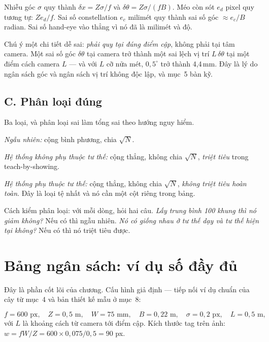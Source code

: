 \documentclass[../../marker.tex]{subfiles}
\begin{document}
Nhiễu góc \(\sigma\) quy thành \(\delta x = Z\sigma/f\) và \(\delta\theta = Z\sigma/(fB)\). Méo còn sót \(e_d\) pixel quy tương tự: \(Z e_d/f\). Sai số constellation \(e_c\) milimét quy thành sai số góc \(\approx e_c/B\) radian. Sai số hand-eye vào thẳng vì nó đã là milimét và độ.

Chú ý một chi tiết dễ sai: \emph{phải quy tại đúng điểm cập}, không phải tại tâm camera. Một sai số góc \(\delta\theta\) tại camera trở thành một sai lệch vị trí \(L\,\delta\theta\) tại một điểm cách camera \(L\) --- và với \(L\) cỡ nửa mét, \(0{,}5^\circ\) trở thành 4,4\,mm. Đây là lý do ngân sách góc và ngân sách vị trí không độc lập, và mục~5 bàn kỹ.

\subsection{C. Phân loại đúng}

Ba loại, và phân loại sai làm tổng sai theo hướng nguy hiểm.

\emph{Ngẫu nhiên:} cộng bình phương, chia \(\sqrt{N}\).

\emph{Hệ thống không phụ thuộc tư thế:} cộng thẳng, không chia \(\sqrt{N}\), \emph{triệt tiêu} trong teach-by-showing.

\emph{Hệ thống phụ thuộc tư thế:} cộng thẳng, không chia \(\sqrt{N}\), \emph{không triệt tiêu hoàn toàn}. Đây là loại tệ nhất và nó cần một cột riêng trong bảng.

Cách kiểm phân loại: với mỗi dòng, hỏi hai câu. \emph{Lấy trung bình 100 khung thì nó giảm không?} Nếu có thì ngẫu nhiên. \emph{Nó có giống nhau ở tư thế dạy và tư thế hiện tại không?} Nếu có thì nó triệt tiêu được.

\section{Bảng ngân sách: ví dụ số đầy đủ}

Đây là phần cốt lõi của chương. Cấu hình giả định --- tiếp nối ví dụ chuẩn của cây từ  mục~4 và bản thiết kế mẫu ở  mục~8:

\[
f = 600\text{ px}, \quad Z = 0{,}5\text{ m}, \quad W = 75\text{ mm}, \quad B = 0{,}22\text{ m}, \quad \sigma = 0{,}2\text{ px}, \quad L = 0{,}5\text{ m},
\]
với \(L\) là khoảng cách từ camera tới điểm cập. Kích thước tag trên ảnh: \(w = fW/Z = 600 \times 0{,}075/0{,}5 = 90\) px.
\end{document}

